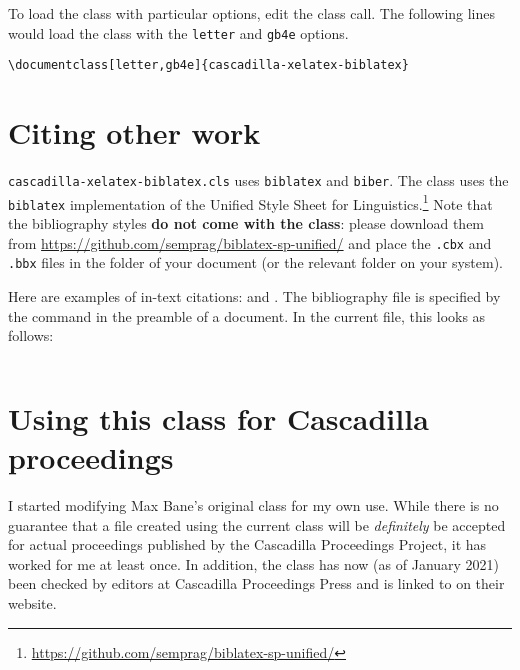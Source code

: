 \documentclass{cascadilla-xelatex-biblatex}
\begin{document}
To load the class with particular options, edit the class call. The following
lines would load the class with the \texttt{letter} and \texttt{gb4e} options.

\begin{verbatim}
\documentclass[letter,gb4e]{cascadilla-xelatex-biblatex}
\end{verbatim}

\section{Citing other work}\label{sec:bib}

\texttt{cascadilla-xelatex-biblatex.cls} uses \texttt{biblatex} and
\texttt{biber}. The class uses the \texttt{biblatex} implementation of the
Unified Style Sheet for
Linguistics.\footnote{\url{https://github.com/semprag/biblatex-sp-unified/}}
Note that the bibliography styles \textbf{do not come with the class}: please
download them from \url{https://github.com/semprag/biblatex-sp-unified/} and
place the \texttt{.cbx} and \texttt{.bbx} files in the folder of your document
(or the relevant folder on your system).

Here are examples of in-text citations: \textcite{Yuan2021} and
\textcite{EKiss2008}. The bibliography file is specified by the
\verb++ command in the preamble of a document. In the
current file, this looks as follows:

\begin{verbatim}

\end{verbatim}

\section{Using this class for Cascadilla proceedings}

I started modifying Max Bane's original class for my own use. While there is no
guarantee that a file created using the current class will be \emph{definitely}
be accepted for actual proceedings published by the Cascadilla Proceedings
Project, it has worked for me at least once. In addition, the class has now (as
of January 2021) been checked by editors at Cascadilla Proceedings Press and is
linked to on their website.

\newrefcontext[sorting=nyt]
\printbibliography
\end{document}
